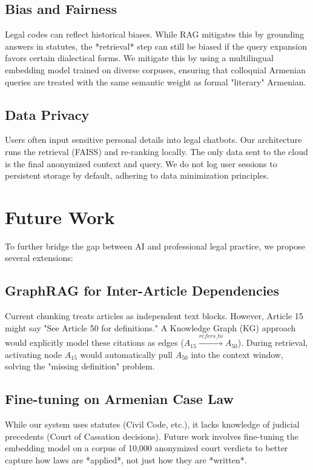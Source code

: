 \documentclass[11pt]{article}
\begin{document}
\subsection{Bias and Fairness}
Legal codes can reflect historical biases. While RAG mitigates this by grounding answers in statutes, the *retrieval* step can still be biased if the query expansion favors certain dialectical forms. We mitigate this by using a multilingual embedding model trained on diverse corpuses, ensuring that colloquial Armenian queries are treated with the same semantic weight as formal "literary" Armenian.

\subsection{Data Privacy}
Users often input sensitive personal details into legal chatbots. Our architecture runs the retrieval (FAISS) and re-ranking locally. The only data sent to the cloud is the final anonymized context and query. We do not log user sessions to persistent storage by default, adhering to data minimization principles.

\section{Future Work}
To further bridge the gap between AI and professional legal practice, we propose several extensions:

\subsection{GraphRAG for Inter-Article Dependencies}
Current chunking treats articles as independent text blocks. However, Article 15 might say "See Article 50 for definitions." A Knowledge Graph (KG) approach would explicitly model these citations as edges ($A_{15} \xrightarrow{refers\_to} A_{50}$). During retrieval, activating node $A_{15}$ would automatically pull $A_{50}$ into the context window, solving the "missing definition" problem.

\subsection{Fine-tuning on Armenian Case Law}
While our system uses statutes (Civil Code, etc.), it lacks knowledge of judicial precedents (Court of Cassation decisions). Future work involves fine-tuning the embedding model on a corpus of 10,000 anonymized court verdicts to better capture how laws are *applied*, not just how they are *written*.
\end{document}
